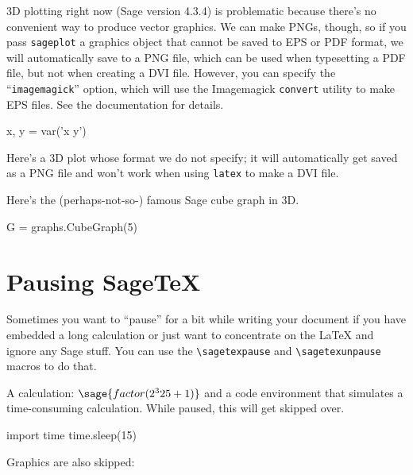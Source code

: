 \documentclass{article}
\begin{document}
3D plotting right now (Sage version 4.3.4) is problematic because
there's no convenient way to produce vector graphics. We can make PNGs,
though, so if you pass \verb|sageplot| a graphics object that cannot be
saved to EPS or PDF format, we will automatically save to a PNG file,
which can be used when typesetting a PDF file, but not when creating a
DVI file. However, you can specify the ``\texttt{imagemagick}'' option,
which will use the Imagemagick \texttt{convert} utility to make EPS
files. See the documentation for details.


\begin{sagesilent}
  x, y = var('x y')
\end{sagesilent}

Here's a 3D plot whose format we do not specify; it will automatically
get saved as a PNG file and won't work when using \texttt{latex} to make
a DVI file.


Here's the (perhaps-not-so-) famous Sage cube graph in 3D.

\begin{sageblock}
  G = graphs.CubeGraph(5)
\end{sageblock}


\section{Pausing Sage\TeX}
\label{sec:pausing-sagetex}

Sometimes you want to ``pause'' for a bit while writing your document if
you have embedded a long calculation or just want to concentrate on the
\LaTeX{} and ignore any Sage stuff. You can use the \verb|\sagetexpause|
and \verb|\sagetexunpause| macros to do that.

\sagetexpause

A calculation: $\sage{factor(2^325 + 1)}$ and a code environment that
simulates a time-consuming calculation. While paused, this will get
skipped over.
\begin{sageblock}
  import time
  time.sleep(15)
\end{sageblock}

Graphics are also skipped: 
\end{document}
